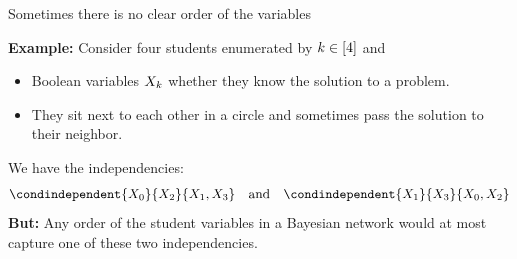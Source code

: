 \documentclass{beamer}
\begin{document}
    \begin{frame}{Sometimes there is no clear order of the variables}%

        \begin{minipage}{0.65\linewidth}
            {\bf Example:}
            Consider four students enumerated by $k\in[4]$ and
            \begin{itemize}
                \item Boolean variables $X_{k}$ whether they know the solution to a problem.
                \item They sit next to each other in a circle and sometimes pass the solution to their neighbor.
            \end{itemize}

        \end{minipage}
        \begin{minipage}{0.3\linewidth}
        \end{minipage}
        \par
        \medskip \noindent
        We have the independencies:
        \begin{align*}
            \condindependent{\catvariableof{0}}{\catvariableof{2}}{\catvariableof{1},\catvariableof{3}}
            \quad \text{and}   \quad \condindependent{\catvariableof{1}}{\catvariableof{3}}{\catvariableof{0},\catvariableof{2}}
        \end{align*}
            {\bf But:} Any order of the student variables in a Bayesian network would at most capture one of these two independencies.

    \end{frame}
\end{document}
